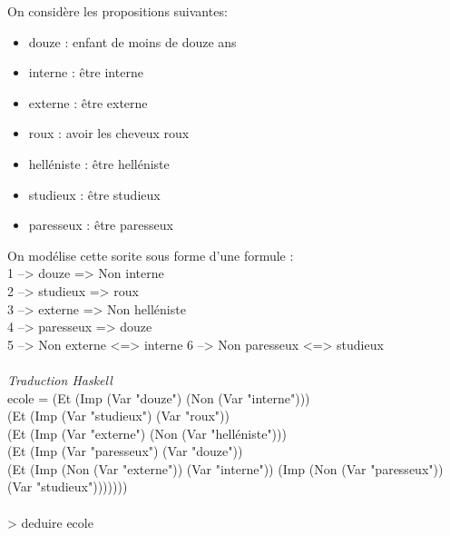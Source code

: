 \documentclass{article}
\begin{document}
On considère les propositions suivantes:
\begin{itemize}
    \item douze : enfant de moins de douze ans
    \item interne : être interne
    \item externe : être externe
    \item roux : avoir les cheveux roux
    \item helléniste : être helléniste
    \item studieux : être studieux
    \item paresseux : être paresseux \\
\end{itemize}
On modélise cette sorite sous forme d'une formule :\\
1 --> douze => Non interne\\
2 --> studieux => roux\\
3 --> externe => Non helléniste\\
4 --> paresseux => douze\\
5 --> Non externe <=> interne
6 --> Non paresseux <=> studieux
\\ \\
\emph{Traduction Haskell}\\
ecole = (Et (Imp (Var "douze") (Non (Var "interne")))\\
    \tabto{18mm}  (Et (Imp (Var "studieux") (Var "roux"))\\
    \tabto{20mm}(Et (Imp (Var "externe") (Non (Var "helléniste")))\\
    \tabto{22mm}(Et (Imp (Var "paresseux") (Var "douze"))\\
    \tabto{24mm}(Et (Imp (Non (Var "externe")) (Var "interne"))
     \tabto{26mm}(Imp (Non (Var "paresseux")) (Var "studieux")))))))\\
\\
> deduire ecole\\
\end{document}
